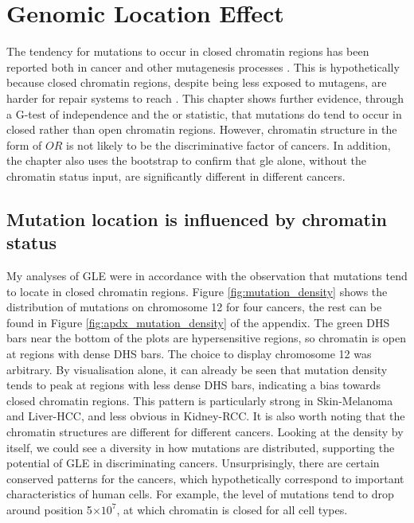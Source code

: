 \chapter{Genomic Location Effect}\label{gle}

The tendency for mutations to occur in closed \gls{chromatin} regions has been reported both in cancer and other mutagenesis processes \citep{Polak2015,Prendergast2007ChromatinGenome}. This is hypothetically because closed chromatin regions, despite being less exposed to mutagens, are harder for repair systems to reach \citep{Prendergast2007ChromatinGenome,Teng1997ExcisionSequences, Morse2002PhotoreactivationCerevisiae}. This chapter shows further evidence, through a G-test of independence and the \gls{or} statistic, that mutations do tend to occur in closed rather than open chromatin regions. However, chromatin structure in the form of $OR$ is not likely to be the discriminative factor of cancers. In addition, the chapter also uses the \gls{bootstrap} to confirm that \gls{gle} alone, without the chromatin status input, are significantly different in different cancers. 

\section{Mutation location is influenced by chromatin status}
My analyses of GLE were in accordance with the observation that mutations tend to locate in closed chromatin regions. Figure \ref{fig:mutation_density} shows the distribution of mutations on chromosome 12 for four cancers, the rest can be found in Figure \ref{fig:apdx_mutation_density} of the appendix. The green DHS bars near the bottom of the plots are hypersensitive regions, so chromatin is open at regions with dense DHS bars. The choice to display chromosome 12 was arbitrary. By visualisation alone, it can already be seen that mutation density tends to peak at regions with less dense DHS bars, indicating a bias towards closed chromatin regions. This pattern is particularly strong in Skin-Melanoma and Liver-HCC, and less obvious in Kidney-RCC. It is also worth noting that the chromatin structures are different for different cancers. Looking at the density by itself, we could see a diversity in how mutations are distributed, supporting the potential of GLE in discriminating cancers. Unsurprisingly, there are certain conserved patterns for the cancers, which hypothetically correspond to important characteristics of human cells. For example, the level of mutations tend to drop around position 5$\times 10^7$, at which chromatin is closed for all cell types.  

